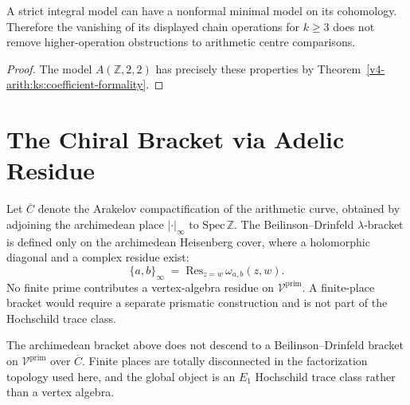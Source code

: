 \begin{corollary}
\label{v4-arith:cor:strict-associativity-Z}
\ClaimStatusProvedHere{}
A strict integral model can have a nonformal minimal model on its cohomology.
Therefore the vanishing of its displayed chain operations for $k\geq3$
does not remove higher-operation obstructions to arithmetic centre comparisons.
\end{corollary}

\begin{proof}
The model $A(\mathbb Z,2,2)$ has precisely these properties by
Theorem~\ref{v4-arith:ks:coefficient-formality}.
\end{proof}



\section{The Chiral Bracket via Adelic Residue}
\label{v4-arith:ks:chiral-bracket-adelic}

\begin{definition}
\label{v4-arith:def:arith-lambda-bracket}
Let \(\overline{C}\) denote the Arakelov compactification of the
arithmetic curve, obtained by adjoining the archimedean place
\(|\cdot|_{\infty}\) to \(\mathrm{Spec}\,\mathbb{Z}\).
The Beilinson--Drinfeld \(\lambda\)-bracket is defined only on the
archimedean Heisenberg cover, where a holomorphic diagonal and a
complex residue exist:
\begin{equation}
\{a,b\}_{\infty}\;=\;\mathrm{Res}_{z=w}\,\omega_{a,b}(z,w).
\end{equation}
No finite prime contributes a vertex-algebra residue on
\(\mathcal{V}^{\mathrm{prim}}\). A finite-place bracket would require
a separate prismatic construction and is not part of the Hochschild
trace class.
\end{definition}

\begin{theorem}
\label{v4-arith:thm:chiral-bracket-adelic}
\ClaimStatusProvedHere{} The archimedean bracket above does not descend
to a Beilinson--Drinfeld bracket on
\(\mathcal{V}^{\mathrm{prim}}\) over \(\overline{C}\). Finite places are
totally disconnected in the factorization topology used here, and the
global object is an \(E_{1}\) Hochschild trace class rather than a
vertex algebra.
\end{theorem}

